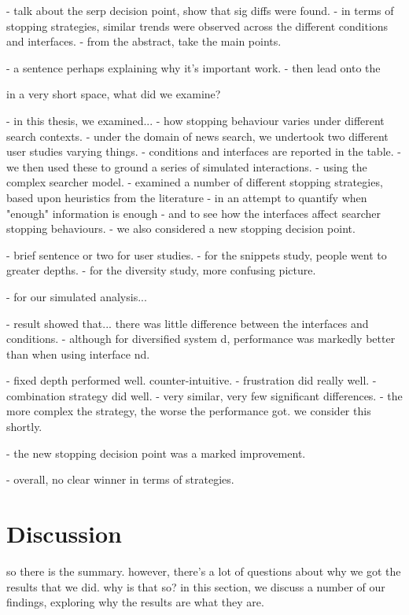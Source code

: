 - talk about the serp decision point, show that sig diffs were found.
- in terms of stopping strategies, similar trends were observed across the different conditions and interfaces.
- from the abstract, take the main points.

- a sentence perhaps explaining why it's important work.
- then lead onto the 


in a very short space, what did we examine?

- in this thesis, we examined...
    - how stopping behaviour varies under different search contexts.
    - under the domain of news search, we undertook two different user studies varying things.
    - conditions and interfaces are reported in the table.
    - we then used these to ground a series of simulated interactions.
    - using the complex searcher model.
    - examined a number of different stopping strategies, based upon heuristics from the literature
        - in an attempt to quantify when "enough" information is enough
    - and to see how the interfaces affect searcher stopping behaviours.
    - we also considered a new stopping decision point.
    
    - brief sentence or two for user studies.
    - for the snippets study, people went to greater depths.
    - for the diversity study, more confusing picture.
    
    - for our simulated analysis...
    
    - result showed that... there was little difference between the interfaces and conditions.
    - although for diversified system d, performance was markedly better than when using interface nd.
    
    - fixed depth performed well. counter-intuitive.
    - frustration did really well.
    - combination strategy did well.
    - very similar, very few significant differences.
    - the more complex the strategy, the worse the performance got. we consider this shortly.
    
    - the new stopping decision point was a marked improvement.
    
    - overall, no clear winner in terms of strategies.

\section{Discussion}\label{sec:conclusions:discussion}
so there is the summary.
however, there's a lot of questions about why we got the results that we did.
why is that so?
in this section, we discuss a number of our findings, exploring why the results are what they are.

